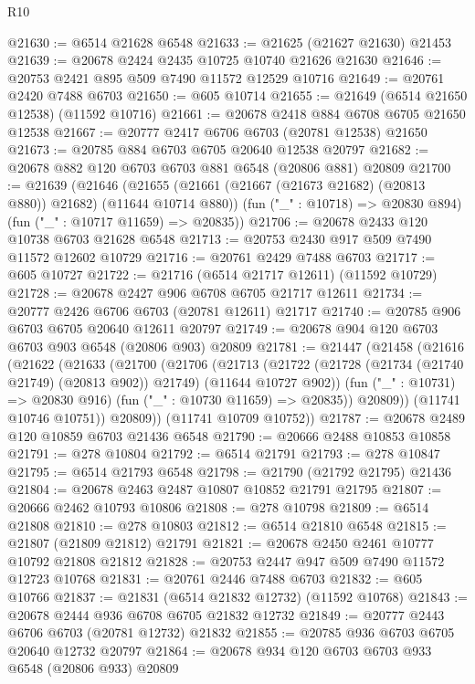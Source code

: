 \begin{lexlean}{R10}
\begin{coremodule}
{{{{{{{{{{{{{{{{{{{{{{{{{{{{{{{{{{{{{{{{{{{{{{{{{{{{{{{{{{{{{{{{{{{{{{{{{{{{{{{{{{{{@21630 := @6514 @21628 @6548
@21633 := @21625 (@21627 @21630) @21453
@21639 := @20678 @2424 @2435 @10725 @10740 @21626 @21630
@21646 := @20753 @2421 @895 @509 @7490 @11572 @12529 @10716
@21649 := @20761 @2420 @7488 @6703
@21650 := @605 @10714
@21655 := @21649 (@6514 @21650 @12538) (@11592 @10716)
@21661 := @20678 @2418 @884 @6708 @6705 @21650 @12538
@21667 := @20777 @2417 @6706 @6703 (@20781 @12538) @21650
@21673 := @20785 @884 @6703 @6705 @20640 @12538 @20797
@21682 := @20678 @882 @120 @6703 @6703 @881 @6548 (@20806 @881) @20809
@21700 := @21639
    (@21646
      (@21655 (@21661 (@21667 (@21673 @21682) (@20813 @880)) @21682) (@11644 @10714 @880))
      (fun ("_" : @10718) => @20830 @894)
      (fun ("_" : @10717 @11659) => @20835))
@21706 := @20678 @2433 @120 @10738 @6703 @21628 @6548
@21713 := @20753 @2430 @917 @509 @7490 @11572 @12602 @10729
@21716 := @20761 @2429 @7488 @6703
@21717 := @605 @10727
@21722 := @21716 (@6514 @21717 @12611) (@11592 @10729)
@21728 := @20678 @2427 @906 @6708 @6705 @21717 @12611
@21734 := @20777 @2426 @6706 @6703 (@20781 @12611) @21717
@21740 := @20785 @906 @6703 @6705 @20640 @12611 @20797
@21749 := @20678 @904 @120 @6703 @6703 @903 @6548 (@20806 @903) @20809
@21781 := @21447
    (@21458
      (@21616
        (@21622
          (@21633
            (@21700
              (@21706
                (@21713
                  (@21722
                    (@21728 (@21734 (@21740 @21749) (@20813 @902)) @21749)
                    (@11644 @10727 @902))
                  (fun ("_" : @10731) => @20830 @916)
                  (fun ("_" : @10730 @11659) => @20835))
                @20809))
            (@11741 @10746 @10751))
          @20809))
      (@11741 @10709 @10752))
@21787 := @20678 @2489 @120 @10859 @6703 @21436 @6548
@21790 := @20666 @2488 @10853 @10858
@21791 := @278 @10804
@21792 := @6514 @21791
@21793 := @278 @10847
@21795 := @6514 @21793 @6548
@21798 := @21790 (@21792 @21795) @21436
@21804 := @20678 @2463 @2487 @10807 @10852 @21791 @21795
@21807 := @20666 @2462 @10793 @10806
@21808 := @278 @10798
@21809 := @6514 @21808
@21810 := @278 @10803
@21812 := @6514 @21810 @6548
@21815 := @21807 (@21809 @21812) @21791
@21821 := @20678 @2450 @2461 @10777 @10792 @21808 @21812
@21828 := @20753 @2447 @947 @509 @7490 @11572 @12723 @10768
@21831 := @20761 @2446 @7488 @6703
@21832 := @605 @10766
@21837 := @21831 (@6514 @21832 @12732) (@11592 @10768)
@21843 := @20678 @2444 @936 @6708 @6705 @21832 @12732
@21849 := @20777 @2443 @6706 @6703 (@20781 @12732) @21832
@21855 := @20785 @936 @6703 @6705 @20640 @12732 @20797
@21864 := @20678 @934 @120 @6703 @6703 @933 @6548 (@20806 @933) @20809
}}}}}}}}}}}}}}}}}}}}}}}}}}}}}}}}}}}}}}}}}}}}}}}}}}}}}}}}}}}}}}}}}}}}}}}}}}}}}}}}}}}}
\end{coremodule}
\end{lexlean}
